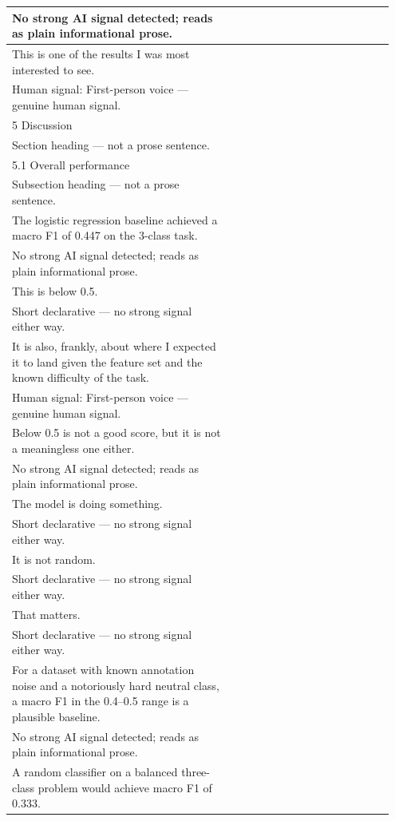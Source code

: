 \documentclass[11pt]{article}
\begin{document}
\begin{longtable}{|p{0.55\linewidth}|p{0.40\linewidth}|}
\hline
No strong AI signal detected; reads as plain informational prose. & \\
\hline
This is one of the results I was most interested to see. & \\[2pt]
\hline
Human signal: First-person voice --- genuine human signal. & \\
\hline
5 Discussion & \\[2pt]
\hline
Section heading --- not a prose sentence. & \\
\hline
5.1 Overall performance & \\[2pt]
\hline
Subsection heading --- not a prose sentence. & \\
\hline
The logistic regression baseline achieved a macro F1 of 0.447 on the 3-class task. & \\[2pt]
\hline
No strong AI signal detected; reads as plain informational prose. & \\
\hline
This is below 0.5. & \\[2pt]
\hline
Short declarative --- no strong signal either way. & \\
\hline
It is also, frankly, about where I expected it to land given the feature set and the known difficulty of the task. & \\[2pt]
\hline
Human signal: First-person voice --- genuine human signal. & \\
\hline
Below 0.5 is not a good score, but it is not a meaningless one either. & \\[2pt]
\hline
No strong AI signal detected; reads as plain informational prose. & \\
\hline
The model is doing something. & \\[2pt]
\hline
Short declarative --- no strong signal either way. & \\
\hline
It is not random. & \\[2pt]
\hline
Short declarative --- no strong signal either way. & \\
\hline
That matters. & \\[2pt]
\hline
Short declarative --- no strong signal either way. & \\
\hline
For a dataset with known annotation noise and a notoriously hard neutral class, a macro F1 in the 0.4--0.5 range is a plausible baseline. & \\[2pt]
\hline
No strong AI signal detected; reads as plain informational prose. & \\
\hline
A random classifier on a balanced three-class problem would achieve macro F1 of 0.333. & \\[2pt]

\end{longtable}
\end{document}
